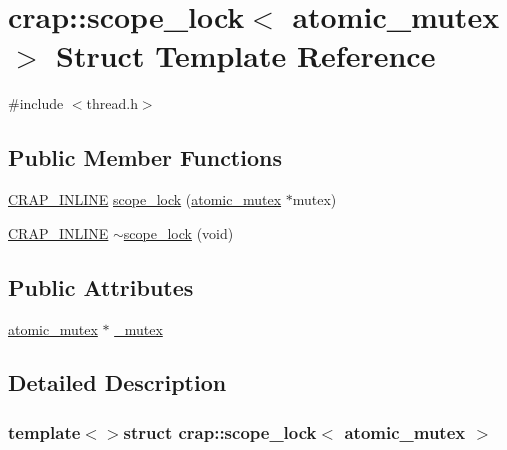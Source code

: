 \hypertarget{structcrap_1_1scope__lock_3_01atomic__mutex_01_4}{\section{crap\+:\+:scope\+\_\+lock$<$ atomic\+\_\+mutex $>$ Struct Template Reference}
\label{structcrap_1_1scope__lock_3_01atomic__mutex_01_4}
}


{\ttfamily \#include $<$thread.\+h$>$}

\subsection*{Public Member Functions}
\begin{DoxyCompactItemize}
\item 
\hyperlink{config__x86_8h_a5a40526b8d842e7ff731509998bb0f1c}{C\+R\+A\+P\+\_\+\+I\+N\+L\+I\+N\+E} \hyperlink{structcrap_1_1scope__lock_3_01atomic__mutex_01_4_a1d8e11542c766c438a8328206aaea9e0}{scope\+\_\+lock} (\hyperlink{structcrap_1_1atomic__mutex}{atomic\+\_\+mutex} $\ast$mutex)
\item 
\hyperlink{config__x86_8h_a5a40526b8d842e7ff731509998bb0f1c}{C\+R\+A\+P\+\_\+\+I\+N\+L\+I\+N\+E} \hyperlink{structcrap_1_1scope__lock_3_01atomic__mutex_01_4_a7481f13fcabcd19c252c5b4877dd2b12}{$\sim$scope\+\_\+lock} (void)
\end{DoxyCompactItemize}
\subsection*{Public Attributes}
\begin{DoxyCompactItemize}
\item 
\hyperlink{structcrap_1_1atomic__mutex}{atomic\+\_\+mutex} $\ast$ \hyperlink{structcrap_1_1scope__lock_3_01atomic__mutex_01_4_a84842a0c0f70416a6b5276469ec292ce}{\+\_\+mutex}
\end{DoxyCompactItemize}


\subsection{Detailed Description}
\subsubsection*{template$<$$>$struct crap\+::scope\+\_\+lock$<$ atomic\+\_\+mutex $>$}



